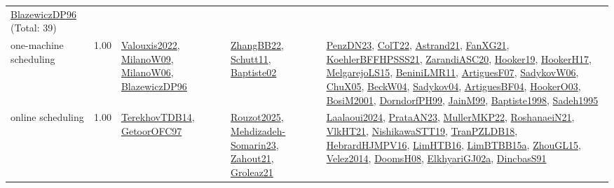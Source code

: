 {\begin{longtable}{p{3cm}r>{\raggedright\arraybackslash}p{6cm}>{\raggedright\arraybackslash}p{6cm}>{\raggedright\arraybackslash}p{8cm}}
\hyperref[detail:BlazewiczDP96]{BlazewiczDP96} (Total: 39)\\
\index{one-machine scheduling}\index{Concepts!one-machine scheduling}one-machine scheduling &  1.00 & \hyperref[detail:Valouxis2022]{Valouxis2022}, \hyperref[detail:MilanoW09]{MilanoW09}, \hyperref[detail:MilanoW06]{MilanoW06}, \hyperref[detail:BlazewiczDP96]{BlazewiczDP96} & \hyperref[detail:ZhangBB22]{ZhangBB22}, \hyperref[detail:Schutt11]{Schutt11}, \hyperref[detail:Baptiste02]{Baptiste02} & \hyperref[detail:PenzDN23]{PenzDN23}, \hyperref[detail:ColT22]{ColT22}, \hyperref[detail:Astrand21]{Astrand21}, \hyperref[detail:FanXG21]{FanXG21}, \hyperref[detail:KoehlerBFFHPSSS21]{KoehlerBFFHPSSS21}, \hyperref[detail:ZarandiASC20]{ZarandiASC20}, \hyperref[detail:Hooker19]{Hooker19}, \hyperref[detail:HookerH17]{HookerH17}, \hyperref[detail:MelgarejoLS15]{MelgarejoLS15}, \hyperref[detail:BeniniLMR11]{BeniniLMR11}, \hyperref[detail:ArtiguesF07]{ArtiguesF07}, \hyperref[detail:SadykovW06]{SadykovW06}, \hyperref[detail:ChuX05]{ChuX05}, \hyperref[detail:BeckW04]{BeckW04}, \hyperref[detail:Sadykov04]{Sadykov04}, \hyperref[detail:ArtiguesBF04]{ArtiguesBF04}, \hyperref[detail:HookerO03]{HookerO03}, \hyperref[detail:BosiM2001]{BosiM2001}, \hyperref[detail:DorndorfPH99]{DorndorfPH99}, \hyperref[detail:JainM99]{JainM99}, \hyperref[detail:Baptiste1998]{Baptiste1998}, \hyperref[detail:Sadeh1995]{Sadeh1995}\\
\index{online scheduling}\index{Concepts!online scheduling}online scheduling &  1.00 & \hyperref[detail:TerekhovTDB14]{TerekhovTDB14}, \hyperref[detail:GetoorOFC97]{GetoorOFC97} & \hyperref[detail:Rouzot2025]{Rouzot2025}, \hyperref[detail:Mehdizadeh-Somarin23]{Mehdizadeh-Somarin23}, \hyperref[detail:Zahout21]{Zahout21}, \hyperref[detail:Groleaz21]{Groleaz21} & \hyperref[detail:Laalaoui2024]{Laalaoui2024}, \hyperref[detail:PrataAN23]{PrataAN23}, \hyperref[detail:MullerMKP22]{MullerMKP22}, \hyperref[detail:RoshanaeiN21]{RoshanaeiN21}, \hyperref[detail:VlkHT21]{VlkHT21}, \hyperref[detail:NishikawaSTT19]{NishikawaSTT19}, \hyperref[detail:TranPZLDB18]{TranPZLDB18}, \hyperref[detail:HebrardHJMPV16]{HebrardHJMPV16}, \hyperref[detail:LimHTB16]{LimHTB16}, \hyperref[detail:LimBTBB15a]{LimBTBB15a}, \hyperref[detail:ZhouGL15]{ZhouGL15}, \hyperref[detail:Velez2014]{Velez2014}, \hyperref[detail:DoomsH08]{DoomsH08}, \hyperref[detail:ElkhyariGJ02a]{ElkhyariGJ02a}, \hyperref[detail:DincbasS91]{DincbasS91}\\

\end{longtable}}
